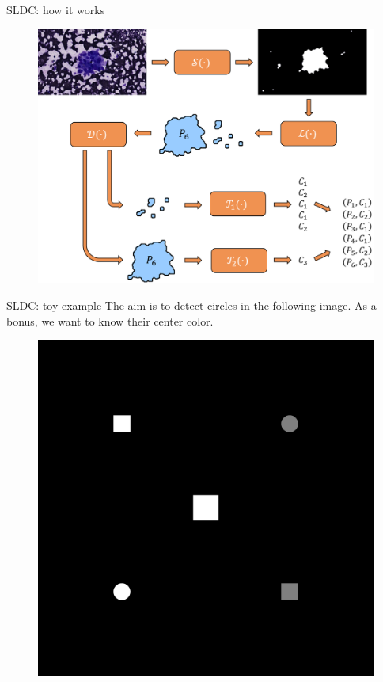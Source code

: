 \documentclass{beamer}
\begin{document}
\begin{frame}{SLDC: how it works}
	\begin{figure}
		\includegraphics[scale=0.45]{images/workflow_illustration.png}
	\end{figure}
\end{frame}


\begin{frame}{SLDC: toy example}
	The aim is to detect circles in the following image. As a bonus, we want to know their center color.
	\vfill
	\begin{figure}
		\includegraphics[scale=0.04]{images/toy_example.png}
	\end{figure}
	\vfill
\end{frame}
\end{document}
